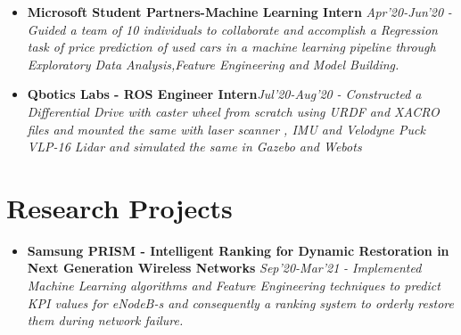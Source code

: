 \documentclass{article}
\begin{document}
\begin{itemize}
    \item{\textbf{\large{Microsoft Student Partners-Machine Learning Intern}}} \hfill \textit{Apr'20-Jun'20}
          \newline
          \textit{-Guided a team of 10 individuals to collaborate and accomplish a Regression task of price prediction of used cars in a machine learning pipeline through Exploratory Data Analysis,Feature Engineering and Model Building.}
\end{itemize}


\begin{itemize}
    \item{\textbf{\large{Qbotics Labs - ROS Engineer Intern}}}\hfill \textit{Jul'20-Aug'20}
          \newline
          \textit{- Constructed a Differential Drive with caster wheel from scratch using URDF and XACRO files and mounted the same with laser scanner , IMU and Velodyne Puck VLP-16 Lidar and simulated the same in Gazebo and Webots}
\end{itemize}







\section*{Research Projects}
\begin{itemize}
    \item{\textbf{\large{Samsung PRISM - Intelligent Ranking for Dynamic Restoration in Next Generation Wireless Networks}}} \hfill \textit{Sep'20-Mar'21}
          \newline
          \textit{- Implemented Machine Learning algorithms and Feature Engineering techniques to predict KPI values for eNodeB-s and consequently a ranking system
              to orderly restore them during network failure.}
\end{itemize}
\end{document}
